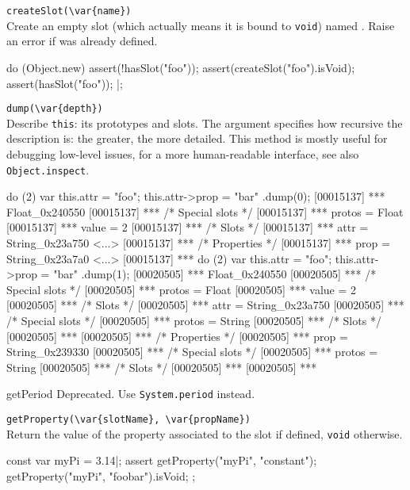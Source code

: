\begin{urbiscriptapi}
\item \lstinline|createSlot(\var{name})|\\
  Create an empty slot (which actually means it is bound to
  \lstinline|void|) named .  Raise an error if 
  was already defined.
\begin{urbiscript}
do (Object.new)
{
  assert(!hasSlot("foo"));
  assert(createSlot("foo").isVoid);
  assert(hasSlot("foo"));
}|;
\end{urbiscript}

\item \lstinline|dump(\var{depth})|\\
  Describe \lstinline|this|: its prototypes and slots.  The argument
   specifies how recursive the description is: the greater,
  the more detailed.  This method is mostly useful for debugging
  low-level issues, for a more human-readable interface, see also
  \lstinline|Object.inspect|.
\begin{urbiscript}
do (2) { var this.attr = "foo"; this.attr->prop = "bar" }.dump(0);
[00015137] *** Float_0x240550 {
[00015137] ***   /* Special slots */
[00015137] ***   protos = Float
[00015137] ***   value = 2
[00015137] ***   /* Slots */
[00015137] ***   attr = String_0x23a750 <...>
[00015137] ***     /* Properties */
[00015137] ***     prop = String_0x23a7a0 <...>
[00015137] ***   }
do (2) { var this.attr = "foo"; this.attr->prop = "bar" }.dump(1);
[00020505] *** Float_0x240550 {
[00020505] ***   /* Special slots */
[00020505] ***   protos = Float
[00020505] ***   value = 2
[00020505] ***   /* Slots */
[00020505] ***   attr = String_0x23a750 {
[00020505] ***     /* Special slots */
[00020505] ***     protos = String
[00020505] ***     /* Slots */
[00020505] ***     }
[00020505] ***     /* Properties */
[00020505] ***     prop = String_0x239330 {
[00020505] ***       /* Special slots */
[00020505] ***       protos = String
[00020505] ***       /* Slots */
[00020505] ***       }
[00020505] ***   }
\end{urbiscript}

\item[getPeriod]
  Deprecated.  Use \lstinline|System.period| instead.

\item \lstinline|getProperty(\var{slotName}, \var{propName})|\\
  Return the value of the  property associated to the
  slot  if defined, \lstinline|void| otherwise.
\begin{urbiscript}
const var myPi = 3.14|;
assert
{
  getProperty("myPi", "constant");
  getProperty("myPi", "foobar").isVoid;
};
\end{urbiscript}


\end{urbiscriptapi}
